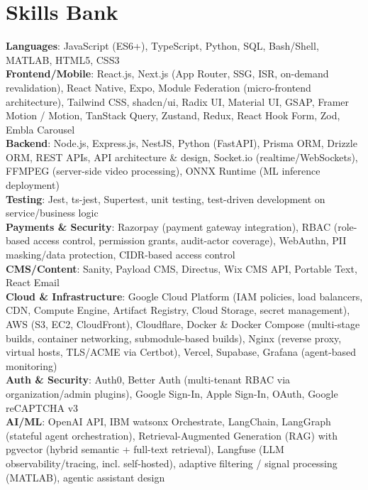 \documentclass[letterpaper,11pt]{article}
\begin{document}
\section{Skills Bank}
 \begin{itemize}[leftmargin=0.15in, label={}]
    \small{\item{
     \textbf{Languages}{: JavaScript (ES6+), TypeScript, Python, SQL, Bash/Shell, MATLAB, HTML5, CSS3} \\
     \textbf{Frontend/Mobile}{: React.js, Next.js (App Router, SSG, ISR, on-demand revalidation), React Native, Expo, Module Federation (micro-frontend architecture), Tailwind CSS, shadcn/ui, Radix UI, Material UI, GSAP, Framer Motion / Motion, TanStack Query, Zustand, Redux, React Hook Form, Zod, Embla Carousel} \\
     \textbf{Backend}{: Node.js, Express.js, NestJS, Python (FastAPI), Prisma ORM, Drizzle ORM, REST APIs, API architecture \& design, Socket.io (realtime/WebSockets), FFMPEG (server-side video processing), ONNX Runtime (ML inference deployment)} \\
     \textbf{Testing}{: Jest, ts-jest, Supertest, unit testing, test-driven development on service/business logic} \\
     \textbf{Payments \& Security}{: Razorpay (payment gateway integration), RBAC (role-based access control, permission grants, audit-actor coverage), WebAuthn, PII masking/data protection, CIDR-based access control} \\
     \textbf{CMS/Content}{: Sanity, Payload CMS, Directus, Wix CMS API, Portable Text, React Email} \\
     \textbf{Cloud \& Infrastructure}{: Google Cloud Platform (IAM policies, load balancers, CDN, Compute Engine, Artifact Registry, Cloud Storage, secret management), AWS (S3, EC2, CloudFront), Cloudflare, Docker \& Docker Compose (multi-stage builds, container networking, submodule-based builds), Nginx (reverse proxy, virtual hosts, TLS/ACME via Certbot), Vercel, Supabase, Grafana (agent-based monitoring)} \\
     \textbf{Auth \& Security}{: Auth0, Better Auth (multi-tenant RBAC via organization/admin plugins), Google Sign-In, Apple Sign-In, OAuth, Google reCAPTCHA v3} \\
     \textbf{AI/ML}{: OpenAI API, IBM watsonx Orchestrate, LangChain, LangGraph (stateful agent orchestration), Retrieval-Augmented Generation (RAG) with pgvector (hybrid semantic + full-text retrieval), Langfuse (LLM observability/tracing, incl. self-hosted), adaptive filtering / signal processing (MATLAB), agentic assistant design} \\
}}
\end{itemize}
\end{document}
